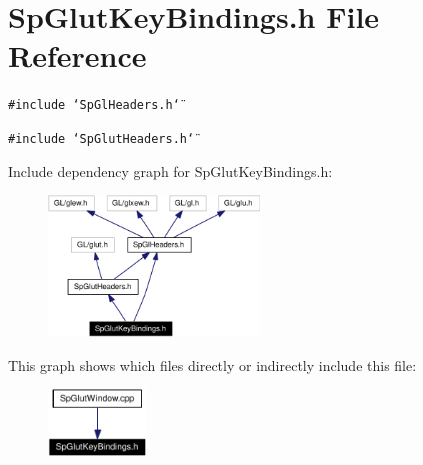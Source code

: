 \section{Sp\-Glut\-Key\-Bindings.h File Reference}
\label{SpGlutKeyBindings_8h}
{\tt \#include \char`\"{}Sp\-Gl\-Headers.h\char`\"{}}\par
{\tt \#include \char`\"{}Sp\-Glut\-Headers.h\char`\"{}}\par


Include dependency graph for Sp\-Glut\-Key\-Bindings.h:\begin{figure}[H]
\begin{center}
\leavevmode
\includegraphics[width=159pt]{SpGlutKeyBindings_8h__incl}
\end{center}
\end{figure}


This graph shows which files directly or indirectly include this file:\begin{figure}[H]
\begin{center}
\leavevmode
\includegraphics[width=74pt]{SpGlutKeyBindings_8h__dep__incl}
\end{center}
\end{figure}
